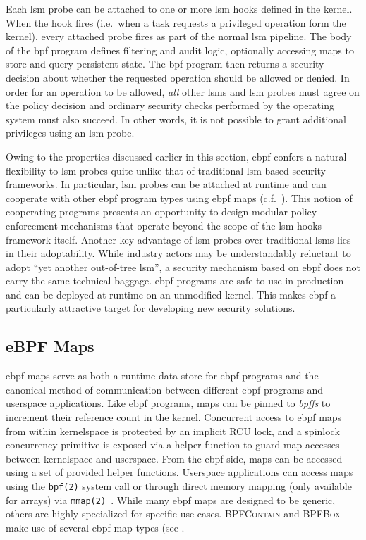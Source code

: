 \documentclass[
  fontsize=12pt,
  titlepage=firstiscover,
  paper=letter,
oneside,
  cleardoublepage=plain,
  parskip=half-,
  DIV=10,
  parindent,
  appendixprefix,
  chapterprefix,
  listof=totoc,
]{scrbook}
\newcommand{\bpfbox}{\textsc{BPFBox}}
\newcommand{\bpfcontain}{\textsc{BPFContain}}
\begin{document}
Each \gls{lsm} probe can be attached to one or more \gls{lsm} hooks defined in the kernel.
When the hook fires (i.e.\ when a task requests a privileged operation form the kernel),
every attached probe fires as part of the normal \gls{lsm} pipeline. The body of the
\gls{bpf} program defines filtering and audit logic, optionally accessing maps to store
and query persistent state. The \gls{bpf} program then returns a security decision about
whether the requested operation should be allowed or denied.  In order for an operation to
be allowed, \textit{all} other \gls{lsm}s and \gls{lsm} probes must agree on the policy
decision and ordinary security checks performed by the operating system must also succeed.
In other words, it is not possible to grant additional privileges using an \gls{lsm}
probe.

Owing to the properties discussed earlier in this section, \gls{ebpf} confers a natural
flexibility to \gls{lsm} probes quite unlike that of traditional \gls{lsm}-based security
frameworks.  In particular, \gls{lsm} probes can be attached at runtime and can cooperate
with other \gls{ebpf} program types using \gls{ebpf} maps (c.f.\ ).
This notion of cooperating programs presents an opportunity to design modular policy
enforcement mechanisms that operate beyond the scope of the \gls{lsm} hooks framework
itself.  Another key advantage of \gls{lsm} probes over traditional \gls{lsm}s lies in
their adoptability.  While industry actors may be understandably reluctant to adopt
\enquote{yet another out-of-tree \gls{lsm}}, a security mechanism based on \gls{ebpf} does
not carry the same technical baggage.  \gls{ebpf} programs are safe to use in production
and can be deployed at runtime on an unmodified kernel.  This makes \gls{ebpf}
a particularly attractive target for developing new security solutions.

\subsection{eBPF Maps}\label{ss:bpf-maps-bg}

\gls{ebpf} maps serve as both a runtime data store for \gls{ebpf} programs and the
canonical method of communication between different \gls{ebpf} programs and userspace
applications. Like \gls{ebpf} programs, maps can be pinned to \textit{bpffs} to increment
their reference count in the kernel.  Concurrent access to \gls{ebpf} maps from within
kernelspace is protected by an implicit RCU lock, and a spinlock concurrency primitive is
exposed via a helper function to guard map accesses between kernelspace and userspace.
From the \gls{ebpf} side, maps can be accessed using a set of provided helper functions.
Userspace applications can access maps using the \texttt{bpf(2)} system call or through
direct memory mapping (only available for arrays) via
\texttt{mmap(2)~\cite{gregg2019_bpf}}. While many \gls{ebpf} maps are designed to be
generic, others are highly specialized for specific use cases. \bpfcontain{} and \bpfbox{}
make use of several \gls{ebpf} map types (see .
\end{document}
